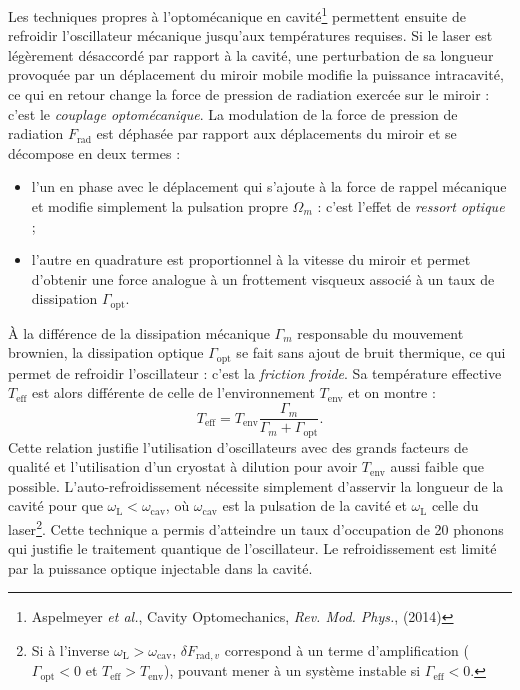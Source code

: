 \documentclass[12pt,a4paper]{article}
\begin{document}
Les techniques propres à l'optomécanique en cavité\footnote{Aspelmeyer \textit{et al.}, Cavity Optomechanics, \textit{Rev. Mod. Phys.}, (2014)} permettent ensuite de refroidir l'oscillateur mécanique jusqu'aux températures requises.
Si le laser est légèrement désaccordé par rapport à la cavité, une perturbation de sa longueur provoquée par un déplacement du miroir mobile modifie la puissance intracavité, ce qui en retour change la force de pression de radiation exercée sur le miroir : c'est le \textit{couplage optomécanique}.
La modulation de la force de pression de radiation $F_\mathrm{rad}$ est déphasée par rapport aux déplacements du miroir et se décompose en deux termes :
\begin{itemize}
\item l'un en phase avec le déplacement qui s'ajoute à la force de rappel mécanique et modifie simplement la pulsation propre $\Omega_m$ : c'est l'effet de \textit{ressort optique} ;
\item l'autre en quadrature est proportionnel à la vitesse du miroir et permet d'obtenir une force analogue à un frottement visqueux associé à un taux de dissipation $\Gamma_\mathrm{opt}$.
\end{itemize}
À la différence de la dissipation mécanique $\Gamma_m$ responsable du mouvement brownien, la dissipation optique $\Gamma_\mathrm{opt}$ se fait sans ajout de bruit thermique, ce qui permet de refroidir l'oscillateur : c'est la \textit{friction froide}.
Sa température effective $T_\mathrm{eff}$ est alors différente de celle de l'environnement $T_\mathrm{env}$ et on montre :
\begin{equation}
T_\mathrm{eff} = T_\mathrm{env} \frac{\Gamma_m}{\Gamma_m+\Gamma_\mathrm{opt}}.
\end{equation}
Cette relation justifie l'utilisation d'oscillateurs avec des grands facteurs de qualité et l'utilisation d'un cryostat à dilution pour avoir $T_\mathrm{env}$ aussi faible que possible.
L'auto-refroidissement nécessite \og simplement \fg{} d'asservir la longueur de la cavité pour que $\omega_\mathrm{L} < \omega_\mathrm{cav}$, où $\omega_\mathrm{cav}$ est la pulsation de la cavité et $\omega_\mathrm{L}$ celle du laser\footnote{Si à l'inverse $\omega_\mathrm{L} > \omega_\mathrm{cav}$, $\delta F_{\mathrm{rad}, v}$ correspond à un terme d'amplification ($\Gamma_\mathrm{opt} < 0 $ et $T_\mathrm{eff} > T_\mathrm{env}$), pouvant mener à un système instable si $\Gamma_\mathrm{eff} < 0$.}.
Cette technique a permis d'atteindre un taux d'occupation de 20 phonons qui justifie le traitement quantique de l'oscillateur.
Le refroidissement est limité par la puissance optique injectable dans la cavité.
\end{document}
